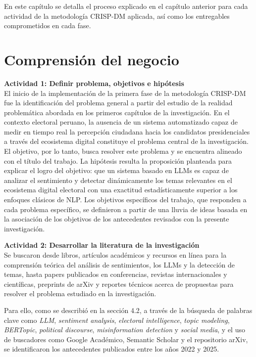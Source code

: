 \documentclass[listof=nochaptergap,12pt,times,authoryear]{report}
\begin{document}
En este capítulo se detalla el proceso explicado en el capítulo anterior para cada
actividad de la metodología CRISP-DM aplicada, así como los entregables comprometidos
en cada fase.

\section{Comprensión del negocio}

\textbf{Actividad 1: Definir problema, objetivos e hipótesis}
\\
El inicio de la implementación de la primera fase de la metodología CRISP-DM fue la
identificación del problema general a partir del estudio de la realidad problemática
abordada en los primeros capítulos de la investigación. En el contexto electoral peruano,
la ausencia de un sistema automatizado capaz de medir en tiempo real la percepción
ciudadana hacia los candidatos presidenciales a través del ecosistema digital constituye
el problema central de la investigación. El objetivo, por lo tanto, busca resolver este
problema y se encuentra alineado con el título del trabajo. La hipótesis resulta la
proposición planteada para explicar el logro del objetivo: que un sistema basado en LLMs
es capaz de analizar el sentimiento y detectar dinámicamente los temas relevantes en
el ecosistema digital electoral con una exactitud estadísticamente superior a los enfoques
clásicos de NLP. Los objetivos específicos del trabajo, que responden a cada problema
específico, se definieron a partir de una lluvia de ideas basada en la asociación de
los objetivos de los antecedentes revisados con la presente investigación.

\textbf{Actividad 2: Desarrollar la literatura de la investigación}
\\
Se buscaron desde libros, artículos académicos y recursos en línea para la comprensión
teórica del análisis de sentimientos, los LLMs y la detección de temas, hasta papers
publicados en conferencias, revistas internacionales y científicas, preprints de arXiv
y reportes técnicos acerca de propuestas para resolver el problema estudiado en la
investigación.

Para ello, como se describió en la sección 4.2, a través de la búsqueda de palabras
clave como \textit{LLM}, \textit{sentiment analysis}, \textit{electoral intelligence},
\textit{topic modeling}, \textit{BERTopic}, \textit{political discourse},
\textit{misinformation detection} y \textit{social media}, y el uso de buscadores como
Google Académico, Semantic Scholar y el repositorio arXiv, se identificaron los
antecedentes publicados entre los años 2022 y 2025.
\end{document}
